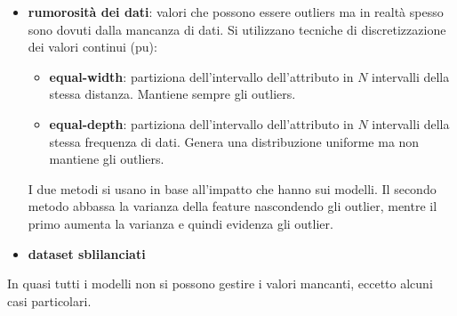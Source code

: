\begin{itemize}
    \item \textbf{rumorosità dei dati}: valori che possono essere outliers ma 
    in realtà spesso sono dovuti dalla mancanza di dati. Si utilizzano tecniche di
    discretizzazione dei valori continui (pu):
    \begin{itemize}
        \item \textbf{equal-width}: partiziona dell'intervallo dell'attributo in $N$ intervalli della stessa
        distanza. Mantiene sempre gli outliers.
        \item \textbf{equal-depth}: partiziona dell'intervallo dell'attributo in $N$ intervalli della stessa
        frequenza di dati. Genera una distribuzione uniforme ma non mantiene 
        gli outliers.
    \end{itemize}
    I due metodi si usano in base all'impatto che hanno sui modelli. Il secondo 
    metodo abbassa la varianza della feature nascondendo gli outlier, mentre il primo aumenta la varianza 
    e quindi evidenza gli outlier.
    \item  \textbf{dataset sblilanciati}
\end{itemize}

In quasi tutti i modelli non si possono gestire i valori mancanti, eccetto alcuni
casi particolari.